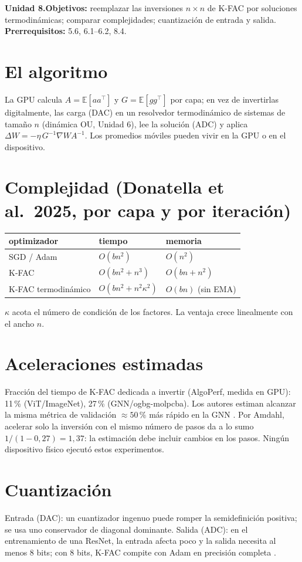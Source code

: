 \documentclass[11pt,a4paper]{article}
\begin{document}

\noindent\textbf{Unidad 8.}\quad\textbf{Objetivos:} reemplazar las inversiones $n\times n$ de K-FAC por soluciones termodinámicas; comparar complejidades;
cuantización de entrada y salida.
\textbf{Prerrequisitos:} 5.6, 6.1--6.2, 8.4.

\section{El algoritmo}
La GPU calcula $A=\mathbb E[aa^\top]$ y $G=\mathbb E[gg^\top]$ por capa; en vez de invertirlas digitalmente, las carga (DAC) en un resolvedor termodinámico de
sistemas de tamaño $n$ (dinámica OU, Unidad 6), lee la solución (ADC) y aplica $\Delta W=-\eta\,G^{-1}\nabla W A^{-1}$. Los promedios móviles pueden vivir en la GPU o en
el dispositivo.

\section{Complejidad (Donatella et al.\ 2025, por capa y por iteración)}
\begin{center}\begin{tabular}{lll}\toprule
optimizador & tiempo & memoria\\\midrule
SGD / Adam & $O(bn^2)$ & $O(n^2)$\\
K-FAC & $O(bn^2+n^3)$ & $O(bn+n^2)$\\
K-FAC termodinámico & $O(bn^2+n^2\kappa^2)$ & $O(bn)$ (sin EMA)\\\bottomrule\end{tabular}\end{center}
$\kappa$ acota el número de condición de los factores. La ventaja crece linealmente con el ancho $n$.

\section{Aceleraciones estimadas}
Fracción del tiempo de K-FAC dedicada a invertir (AlgoPerf, medida en GPU): 11\,\% (ViT/ImageNet), 27\,\% (GNN/ogbg-molpcba). Los autores estiman alcanzar la misma métrica de
validación $\approx50\,\%$ más rápido en la GNN \evP. Por Amdahl, acelerar solo la inversión con el mismo número de pasos da a lo sumo $1/(1-0{,}27)=1{,}37$: la estimación debe
incluir cambios en los pasos. Ningún dispositivo físico ejecutó estos experimentos.

\section{Cuantización}
Entrada (DAC): un cuantizador ingenuo puede romper la semidefinición positiva; se usa uno conservador de diagonal dominante. Salida (ADC): en el entrenamiento de una
ResNet, la entrada afecta poco y la salida necesita al menos 8 bits; con 8 bits, K-FAC compite con Adam en precisión completa \evS.
\end{document}
